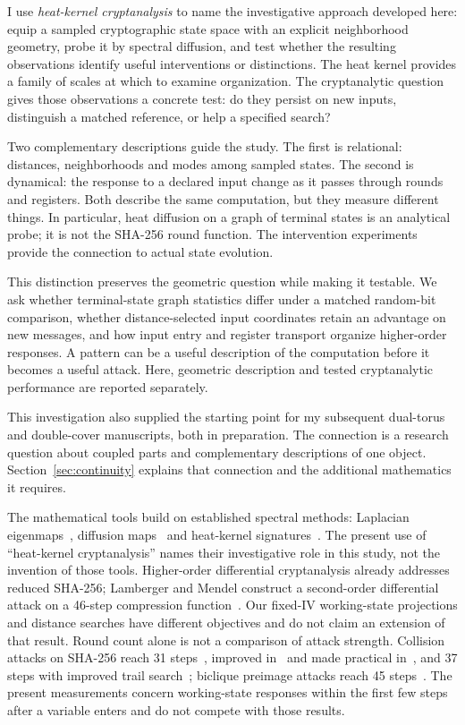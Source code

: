 \documentclass[11pt]{article}
\begin{document}
I use \emph{heat-kernel cryptanalysis} to name the investigative approach developed here: equip a sampled cryptographic state space with an explicit neighborhood geometry, probe it by spectral diffusion, and test whether the resulting observations identify useful interventions or distinctions. The heat kernel provides a family of scales at which to examine organization. The cryptanalytic question gives those observations a concrete test: do they persist on new inputs, distinguish a matched reference, or help a specified search?

Two complementary descriptions guide the study. The first is relational: distances, neighborhoods and modes among sampled states. The second is dynamical: the response to a declared input change as it passes through rounds and registers. Both describe the same computation, but they measure different things. In particular, heat diffusion on a graph of terminal states is an analytical probe; it is not the SHA-256 round function. The intervention experiments provide the connection to actual state evolution.

This distinction preserves the geometric question while making it testable. We ask whether terminal-state graph statistics differ under a matched random-bit comparison, whether distance-selected input coordinates retain an advantage on new messages, and how input entry and register transport organize higher-order responses. A pattern can be a useful description of the computation before it becomes a useful attack. Here, geometric description and tested cryptanalytic performance are reported separately.

This investigation also supplied the starting point for my subsequent dual-torus and double-cover manuscripts, both in preparation. The connection is a research question about coupled parts and complementary descriptions of one object. Section~\ref{sec:continuity} explains that connection and the additional mathematics it requires.

The mathematical tools build on established spectral methods: Laplacian eigenmaps~\cite{belkin}, diffusion maps~\cite{coifman} and heat-kernel signatures~\cite{sun}. The present use of ``heat-kernel cryptanalysis'' names their investigative role in this study, not the invention of those tools. Higher-order differential cryptanalysis already addresses reduced SHA-256; Lamberger and Mendel construct a second-order differential attack on a 46-step compression function~\cite{lamberger}. Our fixed-IV working-state projections and distance searches have different objectives and do not claim an extension of that result. Round count alone is not a comparison of attack strength. Collision attacks on SHA-256 reach 31 steps~\cite{mendel2013}, improved in~\cite{li2024} and made practical in~\cite{li2024asiacrypt}, and 37 steps with improved trail search~\cite{zhang2026}; biclique preimage attacks reach 45 steps~\cite{khovratovich2012}. The present measurements concern working-state responses within the first few steps after a variable enters and do not compete with those results.
\end{document}
